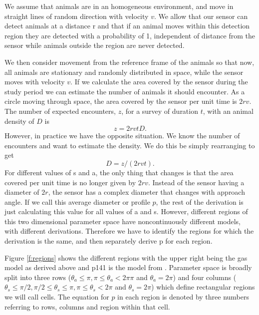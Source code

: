 \documentclass[a4paper,10pt,reqno,oneside]{amsart}
\begin{document}
We assume that animals are in an homogeneous environment, and move in straight lines of random direction with velocity $v$. We allow that our sensor can detect animals at a distance r and that if an animal moves within this detection region they are detected with a probability of 1, independent of distance from the sensor while animals outside the region are never detected.

We then consider movement from the reference frame of the animals so that now, all animals are stationary and randomly distributed in space, while the sensor moves with velocity $v$. If we calculate the area covered by the sensor during the study period we can estimate the number of animals it should encounter. As a circle moving through space, the area covered by the sensor per unit time is $2rv$. The number of expected encounters, $z$, for a survey of duration $t$, with an animal density of $D$ is
\begin{equation}
	z = 2rvtD.
\end{equation}
However, in practice we have the opposite situation. We know the number of encounters and want to estimate the density. We do this be simply rearranging to get
\begin{equation}
	D = z/(2rvt).
\end{equation}
For different values of s and a, the only thing that changes is that the area covered per unit time is no longer given by $2rv$. Instead of the sensor having a diameter of $2r$, the sensor has a complex diameter that changes with approach angle. If we call this average diameter or profile $p$, the rest of the derivation is just calculating this value for all values of a and s. However, different regions of this two dimensional parameter space have noncontinuously different models, with different derivations. Therefore we have to identify the regions for which the derivation is the same, and then separately derive p for each region.

Figure \ref{f:regions} shows the different regions with the upper right being the gas model as derived above and p141 is the model from \cite{Rowcliffe2008estimating}. Parameter space is broadly split into three rows ($ \theta_a \le \pi, \pi \le \theta_a < 2π\pi$ and $ \theta_a = 2\pi$) and four columns ($ \theta_s \le \pi/2,  \pi/2 \le \theta_s \le  \pi,  \pi \le \theta_s < 2\pi$ and $\theta_s = 2\pi$) which define rectangular regions we will call cells. The equation for $p$ in each region is denoted by three numbers referring to rows, columns and region within that cell. 
\end{document}
